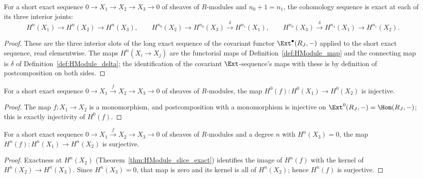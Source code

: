 \begin{theorem}
  \label{thm:HModule_slice_exact}
  \leanok
  For a short exact sequence \(0 \to X_1 \to X_2 \to X_3 \to 0\) of sheaves of \(R\)-modules and
  \(n_0 + 1 = n_1\), the cohomology sequence is exact at each of its three interior joints:
  \[
    H^{n}(X_1) \to H^{n}(X_2) \to H^{n}(X_3), \qquad
    H^{n_0}(X_2) \to H^{n_0}(X_3) \xrightarrow{\delta} H^{n_1}(X_1), \qquad
    H^{n_0}(X_3) \xrightarrow{\delta} H^{n_1}(X_1) \to H^{n_1}(X_2).
  \]
\end{theorem}
\begin{proof}
  \leanok
  These are the three interior slots of the long exact sequence of the covariant functor
  \(\Ext^\bullet(R_J, -)\) applied to the short exact sequence, read elementwise. The maps
  \(H^n(X_i \to X_j)\) are the functorial maps of Definition~\ref{def:HModule_map} and the
  connecting map is \(\delta\) of Definition~\ref{def:HModule_delta}; the identification of the
  covariant \(\Ext\)-sequence's maps with these is by definition of postcomposition on both
  sides.
\end{proof}

\begin{theorem}
  \label{thm:HModule_injective_map_f_zero}
  \leanok
  For a short exact sequence \(0 \to X_1 \xrightarrow{f} X_2 \to X_3 \to 0\) of sheaves of
  \(R\)-modules, the map \(H^0(f) : H^0(X_1) \to H^0(X_2)\) is injective.
\end{theorem}
\begin{proof}
  \leanok
  The map \(f : X_1 \to X_2\) is a monomorphism, and postcomposition with a monomorphism is
  injective on \(\Ext^0(R_J, -) = \Hom(R_J, -)\); this is exactly injectivity of \(H^0(f)\).
\end{proof}

\begin{theorem}
  \label{thm:HModule_surjective_map_f}
  \leanok
  For a short exact sequence \(0 \to X_1 \xrightarrow{f} X_2 \to X_3 \to 0\) of sheaves of
  \(R\)-modules and a degree \(n\) with \(H^n(X_3) = 0\), the map
  \(H^n(f) : H^n(X_1) \to H^n(X_2)\) is surjective.
\end{theorem}
\begin{proof}
  \leanok
  Exactness at \(H^n(X_2)\) (Theorem~\ref{thm:HModule_slice_exact}) identifies the image of
  \(H^n(f)\) with the kernel of \(H^n(X_2) \to H^n(X_3)\). Since \(H^n(X_3) = 0\), that map is
  zero and its kernel is all of \(H^n(X_2)\); hence \(H^n(f)\) is surjective.
\end{proof}

